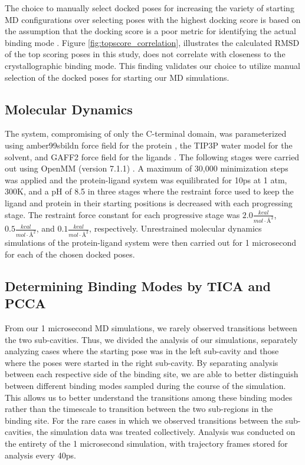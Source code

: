 \documentclass[journal=jcisd8,manuscript=article]{achemso}
\begin{document}
The choice to manually select docked poses for increasing the variety of starting MD configurations over selecting poses with the highest docking score is based on the assumption that the docking score is a poor metric for identifying the actual binding mode \cite{warren_critical_2006}.
Figure \ref{fig:topscore_correlation}, illustrates the calculated RMSD of the top scoring poses in this study, does not correlate with closeness to the crystallographic binding mode.
This finding validates our choice to utilize manual selection of the docked poses for starting our MD simulations.

\subsection{Molecular Dynamics}
The system, compromising of only the C-terminal domain, was parameterized using amber99sbildn force field for the protein \cite{}, the TIP3P water model \cite{} for the solvent, and GAFF2 force field for the ligands \cite{lindorff-larsen_improved_2010}.
The following stages were carried out using OpenMM (version 7.1.1) \cite{eastman_openmm_2017,eastman_openmm_2013}.
A maximum of 30,000 minimization steps was applied and the protein-ligand system was equilibrated for 10ps at 1 atm, 300K, and a pH of 8.5 in three stages where the restraint force used to keep the ligand and protein in their starting positions is decreased with each progressing stage. 
The restraint force constant for each progressive stage was $2.0 \frac{kcal}{mol \cdot \mbox{\AA} ^{2}}$, $0.5 \frac{kcal}{mol \cdot \mbox{\AA} ^{2}}$, and $0.1 \frac{kcal}{mol \cdot \mbox{\AA} ^{2}}$, respectively. 
Unrestrained molecular dynamics simulations of the protein-ligand system were then carried out for 1 microsecond for each of the chosen docked poses.

\subsection{Determining Binding Modes by TICA and PCCA}
From our 1 microsecond MD simulations, we rarely observed transitions between the two sub-cavities.
Thus, we divided the analysis of our simulations, separately analyzing cases where the starting pose was in the left sub-cavity and those where the poses were started in the right sub-cavity.
By separating analysis between each respective side of the binding site, we are able to better distinguish between different binding modes sampled during the course of the simulation. 
This allows us to better understand the transitions among these binding modes rather than the timescale to transition between the two sub-regions in the binding site.
For the rare cases in which we observed transitions between the sub-cavities, the simulation data was treated collectively.
Analysis was conducted on the entirety of the 1 microsecond simulation, with trajectory frames stored for analysis every 40ps.
\end{document}
